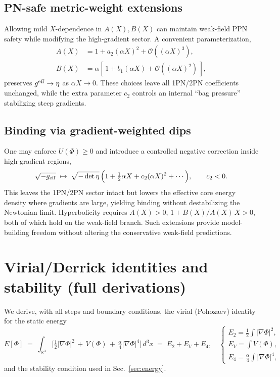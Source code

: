 \documentclass{article}
\begin{document}
\subsection*{PN-safe metric-weight extensions}
Allowing mild $X$-dependence in $A(X),B(X)$ can maintain weak-field PPN safety while modifying the high-gradient sector. 
A convenient parameterization,
\begin{align}
A(X)&=1+a_2(\alpha X)^2+\mathcal{O}((\alpha X)^3),\\
B(X)&=\alpha[\,1+b_1(\alpha X)+\mathcal{O}((\alpha X)^2)\,],
\end{align}
preserves $g^{\rm eff}\to\eta$ as $\alpha X\to0$. 
These choices leave all 1PN/2PN coefficients unchanged, while the extra parameter $c_2$ controls an internal ``bag pressure'' stabilizing steep gradients.

\subsection*{Binding via gradient-weighted dips}
One may enforce $U(\Phi)\ge0$ and introduce a controlled negative correction inside high-gradient regions,
\begin{equation}
\sqrt{-g_{\rm eff}} \;\mapsto\; \sqrt{-\det\eta}\,\Big(1+\tfrac12\alpha X + c_2(\alpha X)^2+\cdots\Big), \qquad c_2<0.
\end{equation}
This leaves the 1PN/2PN sector intact but lowers the effective core energy density where gradients are large, yielding binding without destabilizing the Newtonian limit. 
Hyperbolicity requires $A(X)>0$, $1+B(X)/A(X)\,X>0$, both of which hold on the weak-field branch. 
Such extensions provide model-building freedom without altering the conservative weak-field predictions.
\section{Virial/Derrick identities and stability (full derivations)}
\label{app:virial}

We derive, with all steps and boundary conditions, the virial (Pohozaev) identity for the static energy
\begin{equation}
E[\Phi] \;=\; \int_{\mathbb{R}^3}\!\Big[\tfrac12|\nabla\Phi|^2 \,+\, V(\Phi) \,+\, \tfrac{\alpha}{4}|\nabla\Phi|^4\Big]\,d^3x
\;=\; E_2+E_V+E_4,
\quad
\begin{cases}
E_2=\tfrac12\!\int|\nabla\Phi|^2,\\
E_V=\int V(\Phi),\\
E_4=\tfrac{\alpha}{4}\!\int|\nabla\Phi|^4,
\end{cases}
\label{eq:E-split-app}
\end{equation}
and the stability condition used in Sec.~\ref{sec:energy}.
\end{document}
